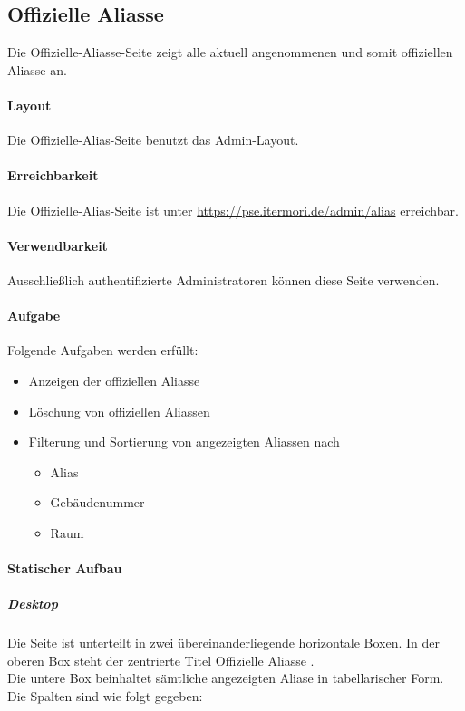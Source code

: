\newpage
\subsection{Offizielle Aliasse}

Die Offizielle-Aliasse-Seite zeigt alle aktuell angenommenen und somit offiziellen Aliasse an.

\paragraph*{Layout}
Die Offizielle-Alias-Seite benutzt das Admin-Layout.

\paragraph*{Erreichbarkeit}
Die Offizielle-Alias-Seite ist unter \href{https://pse.itermori.de/admin/alias}{https://pse.itermori.de/admin/alias} erreichbar.

\paragraph*{Verwendbarkeit}
Ausschließlich authentifizierte Administratoren können diese Seite verwenden.

\paragraph*{Aufgabe}
Folgende Aufgaben werden erfüllt:

\begin{itemize}
    \item Anzeigen der offiziellen Aliasse
    \item Löschung von offiziellen Aliassen
    \item Filterung und Sortierung von angezeigten Aliassen nach 
    \begin{itemize}
        \item Alias
        \item Gebäudenummer
        \item Raum
    \end{itemize}
\end{itemize}

\paragraph*{Statischer Aufbau}
\subparagraph*{Desktop}
Die Seite ist unterteilt in zwei übereinanderliegende horizontale Boxen.
In der oberen Box steht der zentrierte Titel \dq Offizielle Aliasse \dq. \\
Die untere Box beinhaltet sämtliche angezeigten Aliase in tabellarischer Form. Die Spalten sind wie folgt gegeben:

